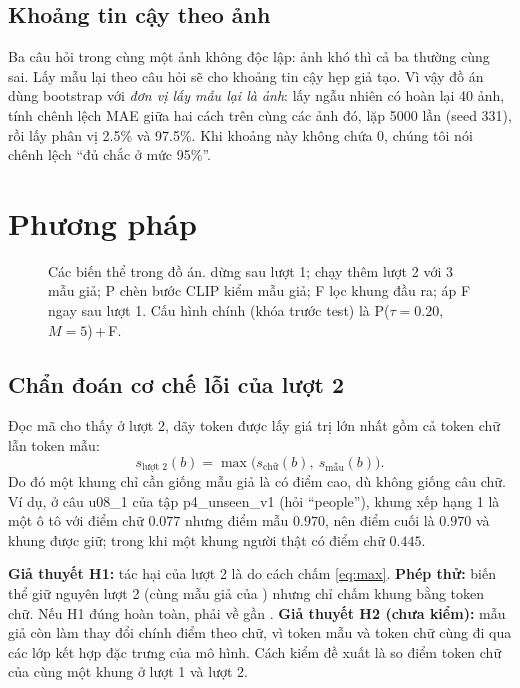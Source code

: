 \documentclass[12pt,a4paper]{article}
\begin{document}
\subsection{Khoảng tin cậy theo ảnh}
Ba câu hỏi trong cùng một ảnh không độc lập: ảnh khó thì cả ba thường cùng sai. Lấy mẫu lại theo câu hỏi sẽ cho khoảng tin cậy hẹp giả tạo. Vì vậy đồ án dùng bootstrap \parencite{efron1979bootstrap} với \emph{đơn vị lấy mẫu lại là ảnh}: lấy ngẫu nhiên có hoàn lại 40 ảnh, tính chênh lệch MAE giữa hai cách trên cùng các ảnh đó, lặp 5000 lần (seed 331), rồi lấy phân vị 2.5\% và 97.5\%. Khi khoảng này không chứa 0, chúng tôi nói chênh lệch ``đủ chắc ở mức 95\%''.

\section{Phương pháp}\label{sec:method}

\begin{figure}[t]
\centering
\resizebox{\textwidth}{!}{}
\caption{Các biến thể trong đồ án. \Bzero{} dừng sau lượt 1; \Btwo{} chạy thêm lượt 2 với 3 mẫu giả; P chèn bước CLIP kiểm mẫu giả; F lọc khung đầu ra; \Csix{} áp F ngay sau lượt 1. Cấu hình chính (khóa trước test) là P($\tau=0.20$, $M=5$)\,+\,F.}
\label{fig:pipeline}
\end{figure}

\subsection{Chẩn đoán cơ chế lỗi của lượt 2}\label{sec:diag-method}
Đọc mã \cgdpp{} cho thấy ở lượt 2, dãy token được lấy giá trị lớn nhất gồm cả token chữ lẫn token mẫu:
\begin{equation}\label{eq:max}
s_{\text{lượt 2}}(b)=\max\bigl(s_{\text{chữ}}(b),\ s_{\text{mẫu}}(b)\bigr).
\end{equation}
Do đó một khung chỉ cần giống mẫu giả là có điểm cao, dù không giống câu chữ. Ví dụ, ở câu u08\_1 của tập p4\_unseen\_v1 (hỏi ``people''), khung xếp hạng 1 là một ô tô với điểm chữ $0.077$ nhưng điểm mẫu $0.970$, nên điểm cuối là $0.970$ và khung được giữ; trong khi một khung người thật có điểm chữ $0.445$.

\textbf{Giả thuyết H1:} tác hại của lượt 2 là do cách chấm \eqref{eq:max}. \textbf{Phép thử:} biến thể \Tv{} giữ nguyên lượt 2 (cùng mẫu giả của \Btwo) nhưng chỉ chấm khung bằng token chữ. Nếu H1 đúng hoàn toàn, \Tv{} phải về gần \Bzero. \textbf{Giả thuyết H2 (chưa kiểm):} mẫu giả còn làm thay đổi chính điểm theo chữ, vì token mẫu và token chữ cùng đi qua các lớp kết hợp đặc trưng của mô hình. Cách kiểm đề xuất là so điểm token chữ của cùng một khung ở lượt 1 và lượt 2.
\end{document}
